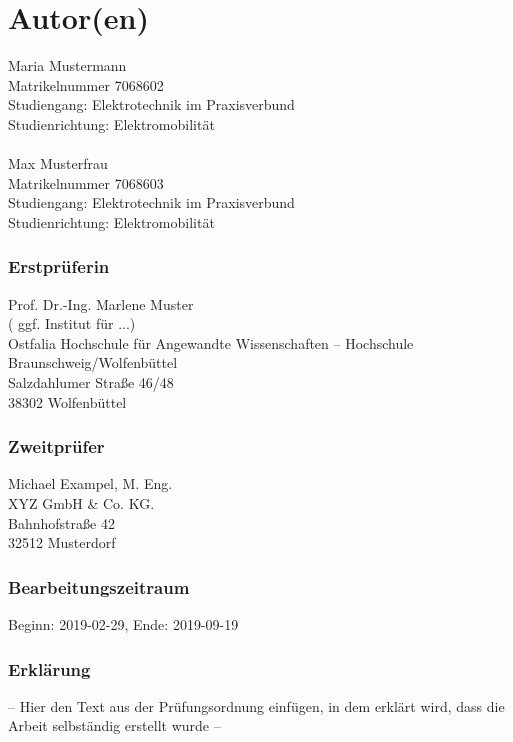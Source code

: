 
\chapter*{Autor(en)}

Maria Mustermann\\
Matrikelnummer 7068602\\
Studiengang: Elektrotechnik im Praxisverbund\\
Studienrichtung: Elektromobilität\\
\vspace{4mm}
\\
Max Musterfrau\\
Matrikelnummer 7068603\\
Studiengang: Elektrotechnik im Praxisverbund\\
Studienrichtung: Elektromobilität

\subsection*{Erstprüferin}

Prof. Dr.-Ing. Marlene Muster\\
( ggf. Institut für ...)\\
Ostfalia Hochschule für Angewandte Wissenschaften -- Hochschule Braunschweig/Wolfenbüttel\\
Salzdahlumer Straße 46/48\\
38302 Wolfenbüttel

\subsection*{Zweitprüfer}

Michael Exampel, M. Eng.\\
XYZ GmbH \& Co. KG.\\
Bahnhofstraße 42\\
32512 Musterdorf

\subsection*{Bearbeitungszeitraum}

Beginn: 2019-02-29, Ende: 2019-09-19

\vfill{}


\subsection*{Erklärung}

-- Hier den Text aus der Prüfungsordnung einfügen, in dem erklärt
wird, dass die Arbeit selbständig erstellt wurde --

